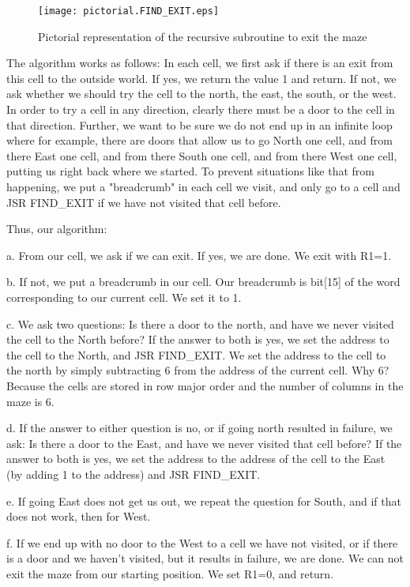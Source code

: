 \documentclass{patt}
\begin{document}
\begin{figure}[h]
\centerline{\texttt{[image: pictorial.FIND\_EXIT.eps]}}
\caption{Pictorial representation of the recursive subroutine to exit the maze}
\label{fig:pictorial.MAZE} 
\end{figure} 

The algorithm works as follows: In each cell, we first ask if there is an exit
from this cell to the outside world.  If yes, we return the value 1 and return.
If not, we ask whether we should try the cell to the north, the east, the
south, or the west.  In order to try a cell in any direction, clearly there must
be a door to the cell in that direction.  Further, we want to be sure we do not
end up in an infinite loop where for example, there are doors that allow us to
go North one cell, and from there East one cell, and from there South one cell,
and from there West one cell, putting us right back where we started.  To 
prevent situations like that from happening, we put a "breadcrumb" in each 
cell we visit, and only go to a cell and JSR FIND\_EXIT if we have not visited 
that cell before.

Thus, our algorithm:

a. From our cell, we ask if we can exit.  If yes, we are done. We exit with 
R1=1.

b. If not, we put a breadcrumb in our cell.  Our breadcrumb is bit[15] of 
the word corresponding to our current cell.  We set it to 1.

c. We ask two questions: Is there a door to the north, and have we never visited
the cell to the North before?  If the answer to both is yes, we set the
address to the cell to the North, and JSR FIND\_EXIT.  We set the address to 
the cell to the north by simply subtracting 6 from the address of the current 
cell.  Why 6?  Because the cells are stored in row major order and the number 
of columns in the maze is 6.

d. If the answer to either question is no, or if going north resulted in 
failure, we ask: Is there a door to the East, and have we never visited that 
cell before?  If the answer to both is yes, we set the address to the address
of the cell to the East (by adding 1 to the address) and JSR FIND\_EXIT.

e. If going East does not get us out, we repeat the question for South, and 
if that does not work, then for West.

f. If we end up with no door to the West to a cell we have not visited, or
if there is a door and we haven't visited, but it results in failure, we are
done.  We can not exit the maze from our starting position.  We set R1=0, and
return. 
\end{document}
